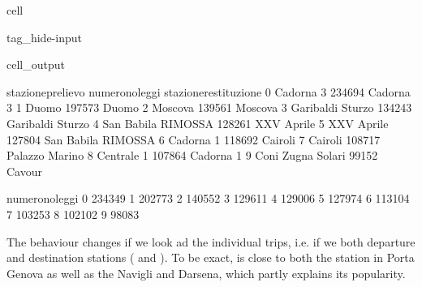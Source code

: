 \documentclass[letterpaper,10pt,english]{jupyterBook}
\begin{document}
\begin{sphinxuseclass}{cell}
\begin{sphinxuseclass}{tag_hide-input}
\begin{sphinxuseclass}{cell_output}
\begin{sphinxVerbatim}[commandchars=\\\{\}]
       stazione\PYGZus{}prelievo  numero\PYGZus{}noleggi  stazione\PYGZus{}restituzione  \PYGZbs{}
0              Cadorna 3          234694              Cadorna 3   
1                  Duomo          197573                  Duomo   
2                Moscova          139561                Moscova   
3     Garibaldi \PYGZhy{} Sturzo          134243     Garibaldi \PYGZhy{} Sturzo   
4  San Babila \PYGZhy{} RIMOSSA\PYGZhy{}          128261             XXV Aprile   
5             XXV Aprile          127804  San Babila \PYGZhy{} RIMOSSA\PYGZhy{}   
6              Cadorna 1          118692                Cairoli   
7                Cairoli          108717         Palazzo Marino   
8             Centrale 1          107864              Cadorna 1   
9      Coni Zugna Solari           99152                 Cavour   

   numero\PYGZus{}noleggi  
0          234349  
1          202773  
2          140552  
3          129611  
4          129006  
5          127974  
6          113104  
7          103253  
8          102102  
9           98083  
\end{sphinxVerbatim}

\end{sphinxuseclass}
\end{sphinxuseclass}
\end{sphinxuseclass}
\sphinxAtStartPar
The behaviour changes if we look ad the individual trips, i.e. if we  both departure and destination stations ( and ). To be exact,  is close to both the station in Porta Genova as well as the Navigli and Darsena, which partly explains its popularity.
\end{document}
